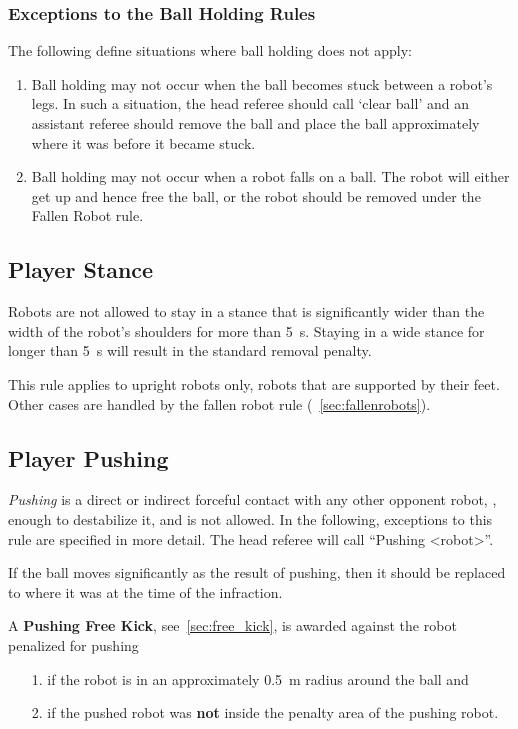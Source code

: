 \subsubsection{Exceptions to the Ball Holding Rules}
\label{sec:situations_no_ball_holding}

The following define situations where ball holding does not apply:
\begin{enumerate}
  \item Ball holding may not occur when the ball becomes stuck between a robot's legs.
    In such a situation, the head referee should call `clear ball' and an assistant referee should remove the ball and place the ball approximately where it was before it became stuck.
  \item Ball holding may not occur when a robot falls on a ball.
    The robot will either get up and hence free the ball, or the robot should be removed under the Fallen Robot rule.
\end{enumerate}

\subsection{Player Stance}
\label{sec:player_stance}

Robots are not allowed to stay in a stance that is significantly wider than the width of the robot's shoulders for more than \qty{5}{\second}.
Staying in a wide stance for longer than \qty{5}{\second} will result in the standard removal penalty.

This rule applies to upright robots only, \ie robots that are supported by their feet.
Other cases are handled by the fallen robot rule (\cf~\cref{sec:fallenrobots}).

\subsection{Player Pushing}
\label{sec:player_pushing}

\emph{Pushing} is a direct or indirect forceful contact with any other opponent robot, \ie, enough to destabilize it, and is not allowed.
In the following, exceptions to this rule are specified in more detail.
The head referee will call ``Pushing \textless robot\textgreater''.

If the ball moves significantly as the result of pushing, then it should be replaced to where it was at the time of the infraction.

A \textbf{Pushing Free Kick}, see~\cref{sec:free_kick}, is awarded against the robot penalized for pushing
\begin{itemize}
  \item[1.] if the robot is in an approximately \qty{0.5}{\metre} radius around the ball and
  \item[2.] if the pushed robot was \textbf{not} inside the penalty area of the pushing robot.
\end{itemize}

